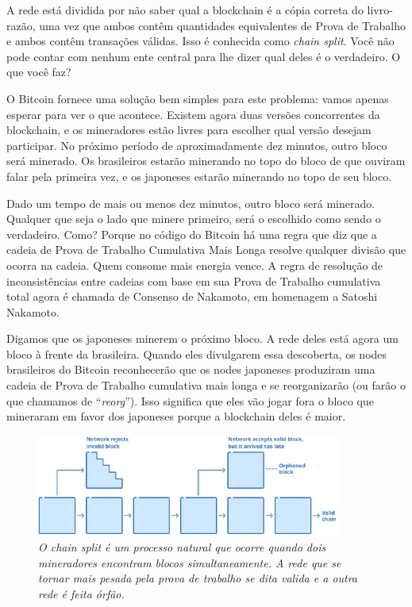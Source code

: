 


A rede está dividida por não saber qual a blockchain é a cópia correta do livro-razão, uma vez que ambos contêm quantidades equivalentes de Prova de Trabalho e ambos contêm transações válidas.
Isso é conhecida como \textit{chain split}.
Você não pode contar com nenhum ente central para lhe dizer qual deles é o verdadeiro.
O que você faz?

O Bitcoin fornece uma solução bem simples para este problema: vamos apenas esperar para ver o que acontece. Existem agora duas versões concorrentes da blockchain, e os mineradores estão livres para escolher qual versão desejam participar. No próximo período de aproximadamente dez minutos, outro bloco será minerado. Os brasileiros estarão minerando no topo do bloco de que ouviram falar pela primeira vez, e os japoneses estarão minerando no topo de seu bloco.

Dado um tempo de mais ou menos dez minutos, outro bloco será minerado.%
Qualquer que seja o lado que minere primeiro, será o escolhido como sendo o verdadeiro. Como? Porque no código do Bitcoin há uma regra que diz que a cadeia de Prova de Trabalho Cumulativa Mais Longa resolve qualquer divisão que ocorra na cadeia. Quem consome mais energia vence. A regra de resolução de inconsistências entre cadeias com base em sua Prova de Trabalho cumulativa total agora é chamada de Consenso de Nakamoto, em homenagem a Satoshi Nakamoto.

Digamos que os japoneses minerem o próximo bloco. A rede deles está agora um bloco à frente da brasileira. Quando eles divulgarem essa descoberta, os nodes brasileiros do Bitcoin reconhecerão que os nodes japoneses produziram uma cadeia de Prova de Trabalho cumulativa mais longa e se reorganizarão (ou farão o que chamamos de “\textit{reorg}”). Isso significa que eles vão jogar fora o bloco que mineraram em favor dos japoneses porque a blockchain deles é maior. 

\begin{figure}[ht]
  \centering
  \includegraphics[width=10cm]{imagens/capitulo6/Capitulo6-Chainsplit.png}
  \caption*{\textit{O chain split é um processo natural que ocorre quando dois mineradores encontram blocos simultaneamente. A rede que se tornar mais pesada pela prova de trabalho se dita valida e a outra rede é feita órfão.}}
\end{figure}

